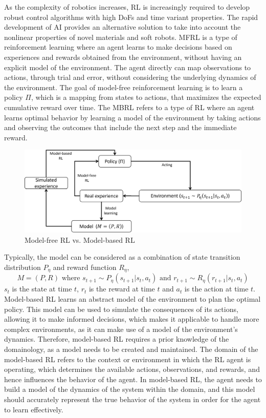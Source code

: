 As the complexity of robotics increases, \ac{RL} is increasingly required to develop robust control algorithms with high \ac{DoF}s and time variant properties\cite{zhangEffectiveSoftRobot2017}. The rapid development of AI provides an alternative solution to take into account the nonlinear properties of novel materials and soft robots\cite{tangModelbasedOnlineLearning2021}. \ac{MFRL} is a type of reinforcement learning where an agent learns to make decisions based on experiences and rewards obtained from the environment, without having an explicit model of the environment. The agent directly can map observations to actions, through trial and error, without considering the underlying dynamics of the environment\cite{arulkumaranDeepReinforcementLearning2017}. The goal of model-free reinforcement learning is to learn a policy $\Pi$, which is a mapping from states to actions, that maximizes the expected cumulative reward over time. The \ac{MBRL} refers to a type of \ac{RL} where an agent learns optimal behavior by learning a model of the environment by taking actions and observing the outcomes that include the next step and the immediate reward\cite{rayModelBasedReinforcementLearning2010}. 
\begin{figure}[H]
    \centering
    \includegraphics[width=\textwidth]{figures/model.png}
    \caption{Model-free \ac{RL} vs. Model-based \ac{RL}}
    \label{fig:demo}
\end{figure}
Typically, the model can be considered as a combination of state transition distribution $P_\eta$ and reward function $R_\eta$, $$M = (P,R) \textrm{ where } s_{t+1}\sim P_\eta(s_{t+1}|s_t, a_t) \textrm{ and } r_{t+1}\sim R_\eta(r_{t+1}|s_t, a_t)$$ $s_t$ is the state at time $t$, $r_t$ is the reward at time $t$ and $a_t$ is the action at time $t$. Model-based \ac{RL} learns an abstract model of the environment to plan the optimal policy. This model can be used to simulate the consequences of its actions, allowing it to make informed decisions, which makes it applicable to handle more complex environments, as it can make use of a model of the environment's dynamics. Therefore, model-based \ac{RL} requires a prior knowledge of the domainology\cite{tangModelbasedOnlineLearning2021}, as a model needs to be created and maintained. The domain of the model-based \ac{RL} refers to the context or environment in which the \ac{RL} agent is operating, which determines the available actions, observations, and rewards, and hence influences the behavior of the agent\cite{langExplorationRelationalDomains}. In model-based \ac{RL}, the agent needs to build a model of the dynamics of the system within the domain, and this model should accurately represent the true behavior of the system in order for the agent to learn effectively.

